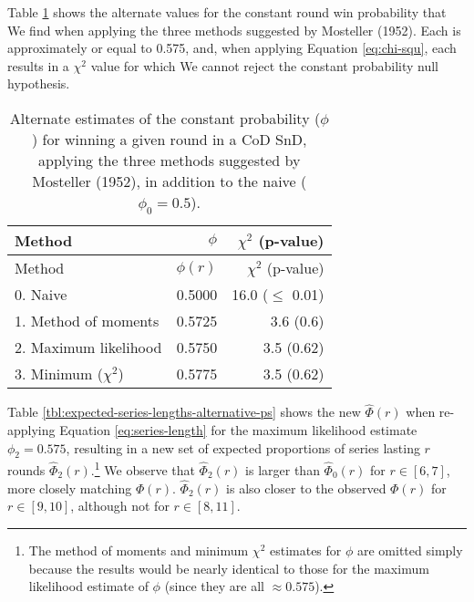 \documentclass{article}
\begin{document}
Table \ref{tbl:mosteller-methods-results} shows the alternate values for
the constant round win probability that We find when applying the three
methods suggested by Mosteller (1952). Each is approximately or equal to
0.575, and, when applying Equation \ref{eq:chi-squ}, each results in a
\(\chi^2\) value for which We cannot reject the constant probability
null hypothesis.

\begin{longtable}[]{@{}lrr@{}}
\caption{Alternate estimates of the constant probability ($\phi$) for winning a given round in a CoD SnD, applying the three methods suggested by Mosteller (1952), in addition to the naive ($\phi_0 = 0.5$).}\label{tbl:mosteller-methods-results} \\
\toprule()
Method & $\phi$ & $\chi^2$ (p-value) \\
\midrule()
\endfirsthead
\toprule()
Method & $\phi(r)$ & $\chi^2$ (p-value) \\
\midrule()
\endhead
0. Naive & 0.5000 & 16.0 ($\leq$ 0.01) \\
1. Method of moments & 0.5725 & 3.6 (0.6) \\
2. Maximum likelihood & 0.5750 & 3.5 (0.62) \\
3. Minimum ($\chi^2$) & 0.5775 & 3.5 (0.62) \\
\bottomrule()
\end{longtable}

Table \ref{tbl:expected-series-lengths-alternative-ps} shows the new
\(\hat{\Phi}(r)\) when re-applying Equation \ref{eq:series-length} for
the maximum likelihood estimate \(\phi_2 = 0.575\), resulting in a new
set of expected proportions of series lasting \(r\) rounds
\(\hat{\Phi}_2(r)\).\footnote{The method of moments and minimum
  \(\chi^2\) estimates for \(\phi\) are omitted simply because the
  results would be nearly identical to those for the maximum likelihood
  estimate of \(\phi\) (since they are all \(\approx 0.575\)).} We
observe that \(\hat{\Phi}_2(r)\) is larger than \(\hat{\Phi}_0(r)\) for
\(r \in [6, 7]\), more closely matching \(\Phi(r)\). \(\hat{\Phi}_2(r)\)
is also closer to the observed \(\Phi(r)\) for \(r \in [9, 10]\),
although not for \(r \in [8, 11]\).
\end{document}
